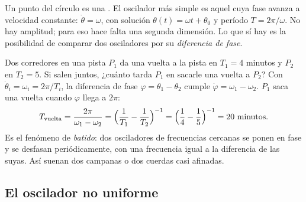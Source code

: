 Un punto del círculo es una . El oscilador más simple es aquel cuya fase avanza a velocidad constante: $\dot\theta=\omega$, con solución $\theta(t)=\omega t+\theta_0$ y período $T=2\pi/\omega$. No hay amplitud; para eso hace falta una segunda dimensión. Lo que sí hay es la posibilidad de comparar dos osciladores por su \emph{diferencia de fase}.

\begin{ejemplo}[label=ej:oc-corredores]{Dos corredores en una pista}
$P_1$ da una vuelta a la pista en $T_1=4$ minutos y $P_2$ en $T_2=5$. Si salen juntos, ¿cuánto tarda $P_1$ en sacarle una vuelta a $P_2$?
\solucion Con $\dot\theta_i=\omega_i=2\pi/T_i$, la diferencia de fase $\varphi=\theta_1-\theta_2$ cumple $\dot\varphi=\omega_1-\omega_2$. $P_1$ saca una vuelta cuando $\varphi$ llega a $2\pi$:
\[
  T_{\text{vuelta}}=\frac{2\pi}{\omega_1-\omega_2}=\Bigl(\frac1{T_1}-\frac1{T_2}\Bigr)^{-1}=\Bigl(\frac14-\frac15\Bigr)^{-1}=20\ \text{minutos}.
\]
Es el fenómeno de \emph{batido}: dos osciladores de frecuencias cercanas se ponen en fase y se desfasan periódicamente, con una frecuencia igual a la diferencia de las suyas. Así suenan dos campanas o dos cuerdas casi afinadas.
\end{ejemplo}


\subsection{El oscilador no uniforme}


